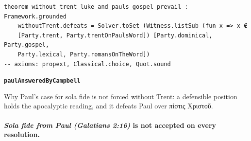 \documentclass[11pt]{article}
\begin{document}
{\small\begin{verbatim}
theorem without_trent_luke_and_pauls_gospel_prevail : Framework.grounded
    withoutTrent.defeats = Solver.toSet (Witness.listSub (fun x => x ∉
    [Party.trent, Party.trentOnPaulsWord]) [Party.dominical, Party.gospel,
    Party.lexical, Party.romansOnTheWord])
-- axioms: propext, Classical.choice, Quot.sound
\end{verbatim}}
\par\medskip\noindent\textbf{\texttt{paul\allowbreak{}Answered\allowbreak{}By\allowbreak{}Campbell}}\par\nobreak\noindent
Why Paul's case for sola fide is not forced without Trent: a defensible position holds the apocalyptic reading, and it defeats Paul over πίστις Χριστοῦ.

\paragraph{\emph{Sola fide from Paul (Galatians 2:16)} is not accepted on every resolution.}
\end{document}
